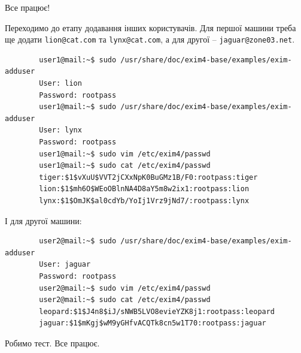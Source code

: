 \documentclass[14pt, a4paper]{extreport}
\begin{document}
	Все працює!
	
	Переходимо до етапу додавання інших користувачів. Для першої машини треба ще додати \texttt{lion@cat.com} та \texttt{lynx@cat.com}, а для другої -- \texttt{jaguar@zone03.net}.
	
	\begin{verbatim}
		user1@mail:~$ sudo /usr/share/doc/exim4-base/examples/exim-adduser
		User: lion
		Password: rootpass
		user1@mail:~$ sudo /usr/share/doc/exim4-base/examples/exim-adduser
		User: lynx
		Password: rootpass
		user1@mail:~$ sudo vim /etc/exim4/passwd
		user1@mail:~$ sudo cat /etc/exim4/passwd
		tiger:$1$vXuU$VVT2jCXxNpK0BuGMz1B/F0:rootpass:tiger
		lion:$1$mh6O$WEoOBlnNA4D8aY5m8w2ix1:rootpass:lion
		lynx:$1$OmJK$al0cdYb/YoIj1Vrz9jNd7/:rootpass:lynx
	\end{verbatim}
	
	І для другої машини:
	
	\begin{verbatim}
		user2@mail:~$ sudo /usr/share/doc/exim4-base/examples/exim-adduser
		User: jaguar
		Password: rootpass
		user2@mail:~$ sudo vim /etc/exim4/passwd
		user2@mail:~$ sudo cat /etc/exim4/passwd
		leopard:$1$J4n8$iJ/sNWB5LVO8evieYZK8j1:rootpass:leopard
		jaguar:$1$mKgj$wM9yGHfvACQTk8cn5w1T70:rootpass:jaguar
	\end{verbatim}
	
	Робимо тест. Все працює.
	
\end{document}
